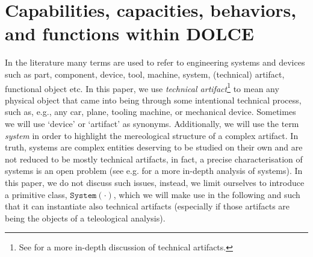 \documentclass[sw]{iosart2x}
\newcommand{\generalStyle}[1]{\texttt{#1}}
\newcommand{\uniRel}[2]{\generalStyle{#1}(#2)}
\newcommand{\DOLCE}{\textsc{DOLCE}\xspace} %
\newcommand{\System}[1]{\uniRel{System}{#1}}
\newcommand{\firstTimeKeyWord}[1]{\textit{#1}}
\newcommand{\quotes}[1]{`#1'}
\begin{document}
\section{Capabilities, capacities, behaviors, and functions within \DOLCE \label{sec:capabilitiesEtc}}
In the literature many terms are used to refer to engineering systems and devices such as part, component, device, tool, machine, system, (technical) artifact, functional object etc. 
In this paper, we use \firstTimeKeyWord{technical artifact}\footnote{See \cite{borgoTechnicalArtifactsIntegrated2017} for a more in-depth discussion of technical artifacts.} to mean any physical object that came into being through some intentional technical process, such as, e.g., any car, plane, tooling machine, or mechanical device. %
Sometimes we will use \quotes{device} or \quotes{artifact} as synonyms. 
Additionally, we will use the term \firstTimeKeyWord{system} in order to highlight the mereological structure of a complex artifact. 
In truth, systems are complex entities deserving to be studied on their own and are not reduced to be mostly technical artifacts, in fact, a precise characterisation of systems is an open problem (see e.g. \cite{mizoguchiRoleSystemicView2021} for a more in-depth analysis of systems). In this paper, we do not discuss such issues, instead, we limit ourselves to introduce a primitive class, $\System{\cdot}$, which we will make use in the following and such that it can instantiate also technical artifacts (especially if those artifacts are being the objects of a teleological analysis).
\end{document}
